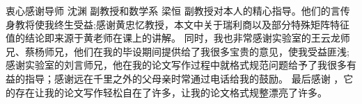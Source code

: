 \begin{acknowledgement}
  衷心感谢导师 沈渊 副教授和数学系 梁恒 副教授对本人的精心指导。他们的言传身教将使我终生受益;感谢黄忠忆教授，本文中关于瑞利商以及部分特殊矩阵特征值的结论即来源于黄老师在课上的讲解。
  同时，我也非常感谢实验室的王云龙师兄、蔡杨师兄，他们在我的毕设期间提供给了我很多宝贵的意见，使我受益匪浅;感谢实验室的刘言师兄，他在我的论文写作过程中就格式规范问题给予了我很多有益的指导；感谢远在千里之外的父母亲时常通过电话给我的鼓励。
  最后感谢 \thuthesis，它的存在让我的论文写作轻松自在了许多，让我的论文格式规整漂亮了许多。
\end{acknowledgement}
